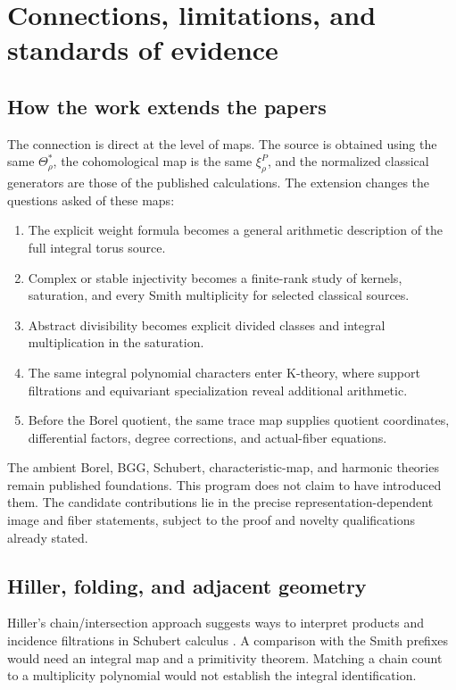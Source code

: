\section{Connections, limitations, and standards of evidence}
\subsection{How the work extends the papers}
The connection is direct at the level of maps. The source is obtained using the same $\Theta_\rho^*$, the cohomological map is the same $\xi_\rho^P$, and the normalized classical generators are those of the published calculations. The extension changes the questions asked of these maps:
\begin{enumerate}
\item The explicit weight formula becomes a general arithmetic description of the full integral torus source.
\item Complex or stable injectivity becomes a finite-rank study of kernels, saturation, and every Smith multiplicity for selected classical sources.
\item Abstract divisibility becomes explicit divided classes and integral multiplication in the saturation.
\item The same integral polynomial characters enter K-theory, where support filtrations and equivariant specialization reveal additional arithmetic.
\item Before the Borel quotient, the same trace map supplies quotient coordinates, differential factors, degree corrections, and actual-fiber equations.
\end{enumerate}
The ambient Borel, BGG, Schubert, characteristic-map, and harmonic theories remain published foundations. This program does not claim to have introduced them. The candidate contributions lie in the precise representation-dependent image and fiber statements, subject to the proof and novelty qualifications already stated.

\subsection{Hiller, folding, and adjacent geometry}
Hiller's chain/intersection approach suggests ways to interpret products and incidence filtrations in Schubert calculus \cite{Hiller}. A comparison with the Smith prefixes would need an integral map and a primitivity theorem. Matching a chain count to a multiplicity polynomial would not establish the integral identification.

